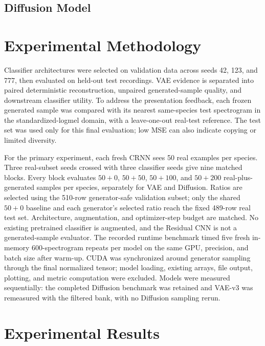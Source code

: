 \documentclass{article}
\begin{document}
\subsection{Diffusion Model}

\section{Experimental Methodology}

Classifier architectures were selected on validation data across seeds 42,
123, and 777, then evaluated on held-out test recordings. VAE evidence is
separated into paired deterministic reconstruction, unpaired generated-sample
quality, and downstream classifier utility. To address the presentation
feedback, each frozen generated sample was compared with its nearest
same-species test spectrogram in the standardized-logmel domain, with a
leave-one-out real-test reference. The test set was used only for this final
evaluation; low MSE can also indicate copying or limited diversity.

For the primary experiment, each fresh CRNN sees 50 real examples per species.
Three real-subset seeds crossed with three classifier seeds give nine matched
blocks. Every block evaluates $50+0$, $50+50$, $50+100$, and $50+200$
real-plus-generated samples per species, separately for VAE and Diffusion.
Ratios are selected using the 510-row generator-safe validation subset; only
the shared $50+0$ baseline and each generator's selected ratio reach the fixed
489-row real test set. Architecture,
augmentation, and optimizer-step budget are matched. No existing pretrained
classifier is augmented, and the Residual CNN is not a generated-sample
evaluator. The recorded runtime benchmark timed five fresh in-memory
600-spectrogram repeats per model on the same GPU, precision, and batch size
after warm-up. CUDA was synchronized around generator sampling through the
final normalized tensor; model loading, existing arrays, file output,
plotting, and metric computation were excluded. Models were measured
sequentially: the completed Diffusion benchmark was retained and VAE-v3 was
remeasured with the filtered bank, with no Diffusion sampling rerun.

\section{Experimental Results}
\end{document}
